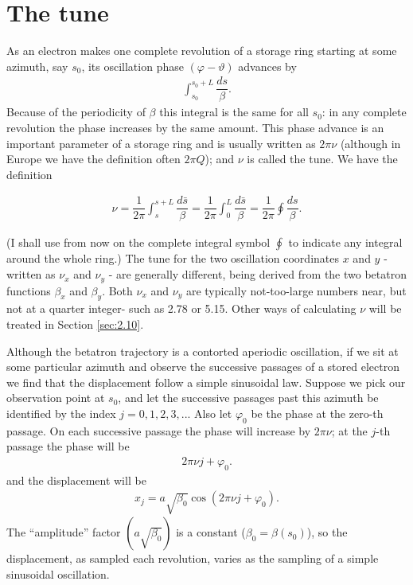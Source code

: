 \section{The tune} \label{sec:2.7}

As an electron makes one complete revolution of a storage ring starting at some azimuth, say $s_0$, its oscillation phase $(\varphi - \vartheta)$ advances by
\begin{align*}
	\int_{s_0}^{s_0+L}\dfrac{ds}{\beta}.
\end{align*}
Because of the periodicity of $\beta$ this integral is the same for all $s_0$: in any complete revolution the phase increases by the same amount. This phase advance is an important parameter of a storage ring and is usually written as $2\pi\nu$ (although in Europe we have the definition often $2\pi Q$); and $\nu$ is called the tune. We have the definition

\begin{align}\label{eq:2.60}
	\boxed{\nu = \dfrac{1}{2\pi} \int_s^{s+L} \dfrac{d\bar{s}}{\beta} = \dfrac{1}{2\pi}\int_0^L \dfrac{d\bar{s}}{\beta} = \dfrac{1}{2\pi} \oint \dfrac{ds}{\beta}}.
\end{align}

(I shall use from now on the complete integral symbol $\oint$ to indicate any integral
around the whole ring.) The tune for the two oscillation coordinates
$x$ and $y$ - written as $\nu_x$ and $\nu_y$ - are generally different, being derived from the two betatron functions $\beta_x$ and $\beta_y$. Both $\nu_x$ and $\nu_y$ are typically not-too-large numbers near, but not at a quarter integer- such as 2.78 or 5.15. Other ways of calculating $\nu$ will be treated in Section \ref{sec:2.10}.

Although the betatron trajectory is a contorted aperiodic oscillation, if we sit at some particular azimuth and observe the successive passages of a stored electron we find that the displacement follow a simple sinusoidal law. Suppose we pick our observation point at $s_0$, and let the successive passages past this azimuth be identified by the index $j=0,1,2,3,...$ Also let $\varphi_0$ be the phase at the zero-th passage. On each successive passage the phase will increase by $2\pi \nu$; at the $j$-th passage the phase will be
\begin{align*}
	2\pi \nu j + \varphi_0.
\end{align*}
and the displacement will be
\begin{align}\label{eq_xj}
	x_j = a \sqrt{\beta_0} \cos(2\pi \nu j + \varphi_0).
\end{align}
The “amplitude” factor $(a \sqrt{\beta_0})$ is a constant ($\beta_0 = \beta(s_0)$), so the displacement, as sampled each revolution, varies as the sampling of a simple sinusoidal oscillation.

